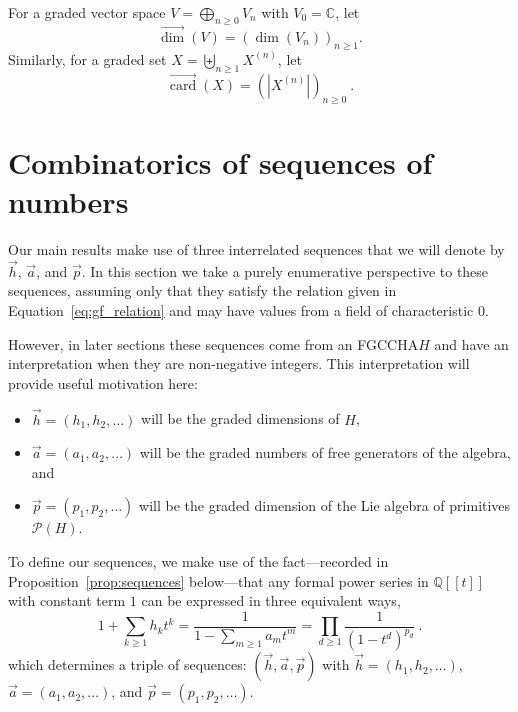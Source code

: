 \documentclass[11pt]{amsart}
\theoremstyle{definition}
\numberwithin{equation}{section}
\def\CC{{\mathbb C}}
\def\QQ{{\mathbb Q}}
\newcommand{\FGCCHA}{\textsf{FGCCHA}\xspace}
\newcommand{\vecdim}{\overrightarrow{\dim}}
\newcommand{\veccard}{\overrightarrow{\operatorname{card}}}
\newcommand{\lucas}[1]{\todo[size=\tiny,color=red!50]{#1 \\ \hfill --- Lucas}}
\begin{document}

For a graded vector space $V = \bigoplus_{n \ge 0} V_{n}$ with $V_{0} = \CC$, let
\[
\vecdim(V) = \left( \dim(V_{n}) \right)_{n \ge 1}.
\]
Similarly, for a graded set $X = \biguplus_{n \ge 1} X^{(n)}$, let
\[
\veccard(X) = \left( |X^{(n)}| \right)_{n \ge 0}~.
\]

\section{Combinatorics of sequences of numbers}
\label{sec:SequencePrelims}

Our main results make use of three interrelated sequences that we will denote by $\vec{h}$, $\vec{a}$, and $\vec{p}$.  
In this section we take a purely enumerative perspective to these sequences, assuming only that they satisfy the relation given in Equation~\eqref{eq:gf_relation} and may have values from a field of characteristic $0$.

However, in later sections these sequences come from an \FGCCHA $H$ and have an interpretation when they are non-negative integers.
This interpretation will provide useful motivation here:
\begin{itemize}
\item $\vec{h} = (h_{1}, h_{2}, \ldots)$ will be the graded dimensions of $H$,

\item $\vec{a} = (a_{1}, a_{2}, \ldots)$ will be the graded numbers of free generators of the algebra, and 

\item $\vec{p} = (p_{1}, p_{2}, \ldots)$ will be the graded dimension of the Lie algebra of primitives $\mathcal{P}(H)$.

\end{itemize}

To define our sequences, we make use of the fact---recorded in Proposition~\ref{prop:sequences}
below---that any formal power series in $\QQ[[t]]$ with constant term $1$
can be expressed in three equivalent ways,
\begin{equation}
\label{eq:gf_relation}
1 + \sum_{k \geq 1} h_k t^k = \frac{1}{1 - \sum_{m \geq 1} a_m t^m} = \prod_{d \geq 1} \frac{1}{(1-t^d)^{p_d}}~.
\end{equation}
which determines a triple of sequences: $(\vec{h}, \vec{a}, \vec{p})$ with $\vec{h} = (h_{1}, h_{2}, \ldots)$, $\vec{a} = (a_{1}, a_{2}, \ldots)$, and $\vec{p} = (p_{1}, p_{2}, \ldots)$.
\end{document}
